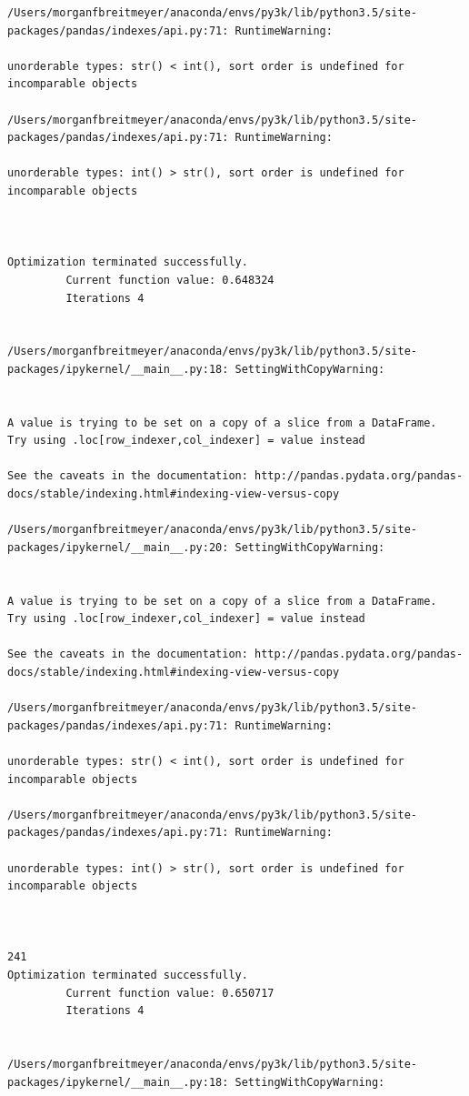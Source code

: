 \begin{lstlisting}
/Users/morganfbreitmeyer/anaconda/envs/py3k/lib/python3.5/site-packages/pandas/indexes/api.py:71: RuntimeWarning:

unorderable types: str() < int(), sort order is undefined for incomparable objects

/Users/morganfbreitmeyer/anaconda/envs/py3k/lib/python3.5/site-packages/pandas/indexes/api.py:71: RuntimeWarning:

unorderable types: int() > str(), sort order is undefined for incomparable objects



Optimization terminated successfully.
         Current function value: 0.648324
         Iterations 4


/Users/morganfbreitmeyer/anaconda/envs/py3k/lib/python3.5/site-packages/ipykernel/__main__.py:18: SettingWithCopyWarning:


A value is trying to be set on a copy of a slice from a DataFrame.
Try using .loc[row_indexer,col_indexer] = value instead

See the caveats in the documentation: http://pandas.pydata.org/pandas-docs/stable/indexing.html#indexing-view-versus-copy

/Users/morganfbreitmeyer/anaconda/envs/py3k/lib/python3.5/site-packages/ipykernel/__main__.py:20: SettingWithCopyWarning:


A value is trying to be set on a copy of a slice from a DataFrame.
Try using .loc[row_indexer,col_indexer] = value instead

See the caveats in the documentation: http://pandas.pydata.org/pandas-docs/stable/indexing.html#indexing-view-versus-copy

/Users/morganfbreitmeyer/anaconda/envs/py3k/lib/python3.5/site-packages/pandas/indexes/api.py:71: RuntimeWarning:

unorderable types: str() < int(), sort order is undefined for incomparable objects

/Users/morganfbreitmeyer/anaconda/envs/py3k/lib/python3.5/site-packages/pandas/indexes/api.py:71: RuntimeWarning:

unorderable types: int() > str(), sort order is undefined for incomparable objects



241
Optimization terminated successfully.
         Current function value: 0.650717
         Iterations 4


/Users/morganfbreitmeyer/anaconda/envs/py3k/lib/python3.5/site-packages/ipykernel/__main__.py:18: SettingWithCopyWarning:



\end{lstlisting}
